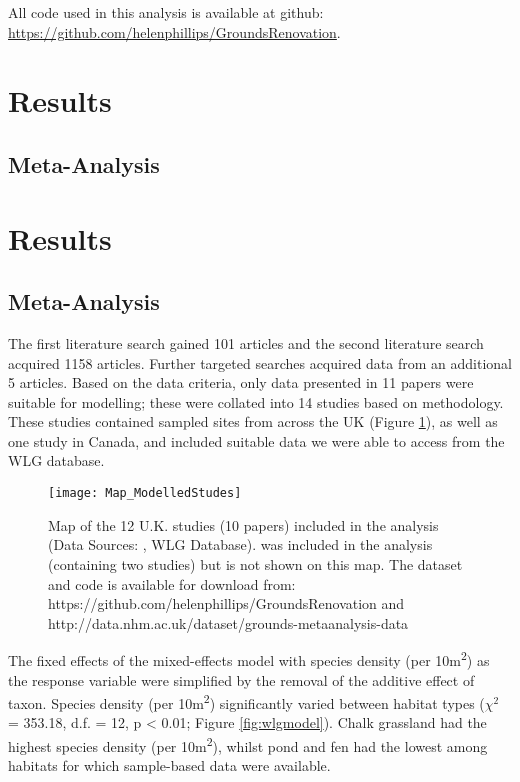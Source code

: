 All code used in this analysis is available at github: \url{https://github.com/helenphillips/GroundsRenovation}.

\ifappendixStyle %
\section{Results}
\subsection{Meta-Analysis}%
\else
\section*{Results}
\subsection*{Meta-Analysis}
\fi

The first literature search gained 101 articles and the second literature search acquired 1158 articles. Further targeted searches acquired data from an additional 5 articles. Based on the data criteria, only data presented in 11 papers were suitable for modelling; these were collated into 14 studies based on methodology. These studies contained sampled sites from across the UK (Figure \ref{fig:wlgmap}), as well as one study in Canada, and included suitable data we were able to access from the WLG database.

\begin{figure}[t]
	\centering
	\texttt{[image: Map\_ModelledStudes]}
	\caption{Map of the 12 U.K. studies (10 papers) included in the analysis (Data Sources: \cite{Petit:1998bc,Wilson:2003aee,Fountain:2004et,Smith:2006ue,Butt:2008ejsb,Williams:2008hb,Scriven:2013ije,Sirohi:2015jic,Speak:2015ufug}, WLG Database). \cite{Macivor:2011ue} was included in the analysis (containing two studies) but is not shown on this map. The dataset and code is available for download from: https://github.com/helenphillips/GroundsRenovation and http://data.nhm.ac.uk/dataset/grounds-metaanalysis-data}
   	 \label{fig:wlgmap}
\end{figure}

The fixed effects of the mixed-effects model with species density (per 10m\textsuperscript{2}) as the response variable were simplified by the removal of the additive effect of taxon. Species density (per 10m\textsuperscript{2}) significantly varied between habitat types ($\chi^2$ = 353.18, d.f. = 12, p < 0.01; Figure \ref{fig:wlgmodel}). Chalk grassland had the highest species density (per 10m\textsuperscript{2}), whilst pond and fen had the lowest among habitats for which sample-based data were available. 

